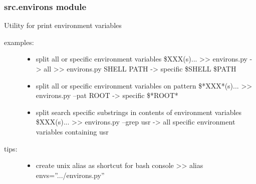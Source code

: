 \documentclass[a4paper,10pt,english]{sphinxmanual}
\begin{document}
\subsubsection{src.environs module}
\label{commands/apidoc/src:module-src.environs}\label{commands/apidoc/src:src-environs-module}
Utility for print environment variables
\begin{description}
\item[{examples: }] \leavevmode\begin{itemize}
\item {} 
split all or specific environment variables \$XXX(s)...
\textgreater{}\textgreater{} environs.py -\textgreater{} all
\textgreater{}\textgreater{} environs.py SHELL PATH -\textgreater{} specific \$SHELL \$PATH

\item {} 
split all or specific environment variables on pattern \$*XXX*(s)...
\textgreater{}\textgreater{} environs.py --pat ROOT -\textgreater{} specific \$*ROOT*

\item {} 
split search specific substrings in contents of environment variables \$XXX(s)...
\textgreater{}\textgreater{} environs.py --grep usr  -\textgreater{} all specific environment variables containing usr

\end{itemize}

\item[{tips:}] \leavevmode\begin{itemize}
\item {} 
create unix alias as shortcut for bash console
\textgreater{}\textgreater{} alias envs=''.../environs.py''

\end{itemize}

\end{description}

\begin{fulllineitems}
\label{commands/apidoc/src:src.environs.print_grep_environs}
\end{fulllineitems}


\begin{fulllineitems}
\label{commands/apidoc/src:src.environs.print_split_environs}
\end{fulllineitems}
\end{document}
